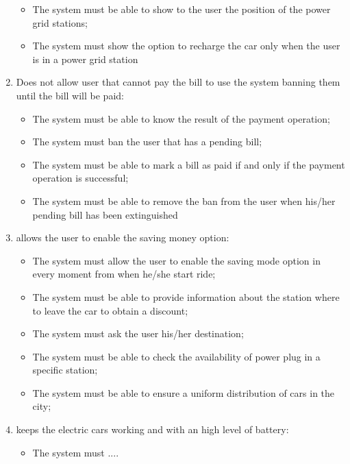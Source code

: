 \begin{enumerate}
\begin{itemize}
\item The system must be able to show to the user the position of the  power grid stations;
\item The system must show the option to recharge the car only when the user is in a power grid station
\end{itemize}

\item Does not allow user that cannot pay the bill to use the system banning them until the bill will be paid:
\begin{itemize}
\item The system must be able to know the result of the payment operation;
\item The system must ban the user that has a pending bill;
\item The system must be able to mark a bill as paid if and only if the payment operation is successful;
\item The system must be able to remove the ban from the user when his/her pending bill has been extinguished
\end{itemize}

\item allows the user to enable the saving money option:

\begin{itemize}
\item The system must allow the user to enable the saving mode option in every moment from when he/she start ride;
\item The system must be able to provide information about the station where to leave the car to obtain a discount;
\item The system must ask the user his/her destination;
\item The system must be able to check the availability of power plug in a specific station;
\item The system must be able to ensure a uniform distribution of cars in the city;
\end{itemize}

\item keeps the electric cars working and with an high level of battery:
\begin{itemize}
\item The system must .... %
\end{itemize}
\end{enumerate}

